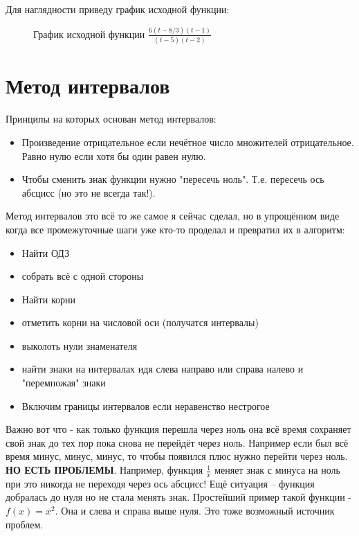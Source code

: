 \documentclass{article}
\begin{document}
\begin{samepage}
Для наглядности приведу график исходной функции:
\begin{figure}[H]
\centering
{}
\caption{График исходной функции $\frac{6(t-8/3)(t-1)}{(t-5)(t-2)}$}
\label{fig:f6}
\end{figure}

\end{samepage}

\section{Метод интервалов}
Принципы на которых основан метод интервалов:
\begin{itemize}
    \item Произведение отрицательное если нечётное число множителей отрицательное. Равно нулю если хотя бы один равен нулю.
    \item Чтобы сменить знак функции нужно "пересечь ноль". Т.е. пересечь ось абсцисс (но это не всегда так!).
\end{itemize}

Метод интервалов это всё то же самое я сейчас сделал, но в упрощённом виде когда все промежуточные шаги уже кто-то проделал и превратил их в алгоритм:
\begin{itemize}
    \item Найти ОДЗ
    \item собрать всё с одной стороны
    \item Найти корни
    \item отметить корни на числовой оси (получатся интервалы)
    \item выколоть нули знаменателя
    \item найти знаки на интервалах идя слева направо или справа налево и "перемножая" знаки
    \item Включим границы интервалов если неравенство нестрогое
\end{itemize}
Важно вот что - как только функция перешла через ноль она всё время сохраняет свой знак до тех пор пока снова не перейдёт через ноль. Например если был всё время минус, минус, минус, то чтобы появился плюс нужно перейти через ноль. \textbf{\color{red}НО ЕСТЬ ПРОБЛЕМЫ}. Например, функция $\frac{1}{x}$ меняет знак с минуса на ноль при это никогда не переходя через ось абсцисс! Ещё ситуация -- функция добралась до нуля но не стала менять знак. Простейший пример такой функции - $f(x)=x^2$. Она и слева и справа выше нуля. Это тоже возможный источник проблем.
\end{document}
